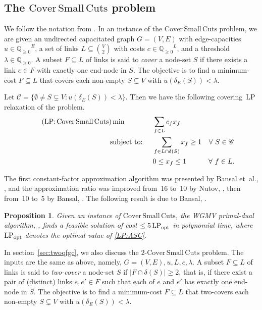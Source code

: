 \documentclass[11pt]{article}
\newtheorem{proposition}[theorem]{Proposition}
\newcommand\lpopt{\hbox{\text{LP}$_{\text{opt}}$}}
\newcommand{\Q}{\ensuremath{\mathbb Q}}
\newcommand{\Qp}{\ensuremath{\Q_{\geq 0}}}
\newcommand{\C}{\mathscr{C}}
\newcommand\capbound{\lambda}
\newcommand{\pliableapx}{5}
\newcommand\ASC{\mathrm{Cover\,Small\,Cuts}}
\newcommand\twoASC{\mathrm{2\text{-}Cover\,Small\,Cuts}}
\begin{document}
\subsection*{The $\ASC$ problem}
We follow the notation from \cite[Section~1.3]{BCGI:arxiv}.
In an instance of the $\ASC$ problem, we are given an
undirected capacitated graph $G = (V,E)$ with edge-capacities $u
\in \Qp^E$, a set of links $L \subseteq \binom{V}{2}$ with costs
$c \in \Qp^L$, and a threshold $\capbound \in \Qp$.
A subset $F \subseteq L$ of links is said to \emph{cover} a
node-set $S$ if there exists a link $e \in F$ with exactly one
end-node in $S$.
The objective is to find a minimum-cost $F\subseteq{L}$ that covers
each non-empty $S \subsetneq V$ with $u(\delta_E(S)) < \capbound$.

Let $\C = \{ \emptyset \neq S \subsetneq V : u(\delta_E(S)) < \capbound \}$.
Then we have the following covering~LP relaxation of the problem.
\begin{align*}\label{LP:ASC} \tag{LP:\,{Cover\,Small\,Cuts}}
\min \quad \qquad		& \quad \sum_{f \in L} c_f x_f 		& \\
\text{subject to: } 	& \quad \sum_{f\in L\cap\delta(S)} x_f \geq 1 	& \forall \, \, S \in \C \\
					& \quad 0\leq x_f \leq 1 & \forall \, \, f \in L. \\
\end{align*}

The first constant-factor approximation algorithm was presented by
Bansal et~al., \cite{BCGI24}, and the approximation ratio was
improved from~16 to~10 by Nutov, \cite{N2024}, then from~10 to~5
by Bansal, \cite{B2023}.
The following result is due to Bansal, \cite{B2023}.

\begin{proposition} \label{prop:approxASC}
Given an instance of $\ASC$, the WGMV primal-dual algorithm, \cite{WGMV95}, finds
a feasible solution of cost $\leq \pliableapx\,\lpopt$ in polynomial time,
where $\lpopt$ denotes the optimal value of \eqref{LP:ASC}.
\end{proposition}

In section~\ref{sec:twoqfgc}, we also discuss the $\twoASC$ problem.
The inputs are the same as above, namely, $G=(V,E), u, L, c, \capbound$.
A subset $F \subseteq L$ of links is said to \emph{two-cover} a
node-set $S$ if $|F\cap\delta(S)|\geq2$, that is,
if there exist a pair of (distinct) links $e,e' \in F$
such that each of $e$ and $e'$ has exactly one end-node in $S$.
The objective is to find a minimum-cost $F\subseteq{L}$ that two-covers
each non-empty $S \subsetneq V$ with $u(\delta_E(S)) < \capbound$.
\end{document}
